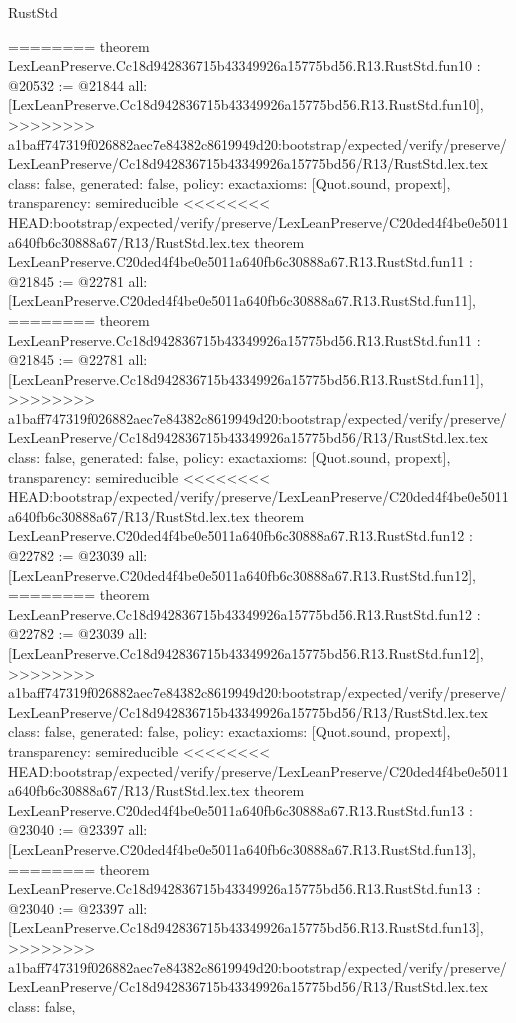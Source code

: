 \begin{lexlean}{RustStd}
\begin{coremodule}
{\begin{coremodule}
{{{{{{{{{{{{{========
theorem LexLeanPreserve.Cc18d942836715b43349926a15775bd56.R13.RustStd.fun10 : @20532 := @21844 {
  all: [LexLeanPreserve.Cc18d942836715b43349926a15775bd56.R13.RustStd.fun10],
>>>>>>>> a1baff747319f026882aec7e84382c8619949d20:bootstrap/expected/verify/preserve/LexLeanPreserve/Cc18d942836715b43349926a15775bd56/R13/RustStd.lex.tex
  class: false,
  generated: false,
  policy: exact{axioms: [Quot.sound, propext]},
  transparency: semireducible
}
<<<<<<<< HEAD:bootstrap/expected/verify/preserve/LexLeanPreserve/C20ded4f4be0e5011a640fb6c30888a67/R13/RustStd.lex.tex
theorem LexLeanPreserve.C20ded4f4be0e5011a640fb6c30888a67.R13.RustStd.fun11 : @21845 := @22781 {
  all: [LexLeanPreserve.C20ded4f4be0e5011a640fb6c30888a67.R13.RustStd.fun11],
========
theorem LexLeanPreserve.Cc18d942836715b43349926a15775bd56.R13.RustStd.fun11 : @21845 := @22781 {
  all: [LexLeanPreserve.Cc18d942836715b43349926a15775bd56.R13.RustStd.fun11],
>>>>>>>> a1baff747319f026882aec7e84382c8619949d20:bootstrap/expected/verify/preserve/LexLeanPreserve/Cc18d942836715b43349926a15775bd56/R13/RustStd.lex.tex
  class: false,
  generated: false,
  policy: exact{axioms: [Quot.sound, propext]},
  transparency: semireducible
}
<<<<<<<< HEAD:bootstrap/expected/verify/preserve/LexLeanPreserve/C20ded4f4be0e5011a640fb6c30888a67/R13/RustStd.lex.tex
theorem LexLeanPreserve.C20ded4f4be0e5011a640fb6c30888a67.R13.RustStd.fun12 : @22782 := @23039 {
  all: [LexLeanPreserve.C20ded4f4be0e5011a640fb6c30888a67.R13.RustStd.fun12],
========
theorem LexLeanPreserve.Cc18d942836715b43349926a15775bd56.R13.RustStd.fun12 : @22782 := @23039 {
  all: [LexLeanPreserve.Cc18d942836715b43349926a15775bd56.R13.RustStd.fun12],
>>>>>>>> a1baff747319f026882aec7e84382c8619949d20:bootstrap/expected/verify/preserve/LexLeanPreserve/Cc18d942836715b43349926a15775bd56/R13/RustStd.lex.tex
  class: false,
  generated: false,
  policy: exact{axioms: [Quot.sound, propext]},
  transparency: semireducible
}
<<<<<<<< HEAD:bootstrap/expected/verify/preserve/LexLeanPreserve/C20ded4f4be0e5011a640fb6c30888a67/R13/RustStd.lex.tex
theorem LexLeanPreserve.C20ded4f4be0e5011a640fb6c30888a67.R13.RustStd.fun13 : @23040 := @23397 {
  all: [LexLeanPreserve.C20ded4f4be0e5011a640fb6c30888a67.R13.RustStd.fun13],
========
theorem LexLeanPreserve.Cc18d942836715b43349926a15775bd56.R13.RustStd.fun13 : @23040 := @23397 {
  all: [LexLeanPreserve.Cc18d942836715b43349926a15775bd56.R13.RustStd.fun13],
>>>>>>>> a1baff747319f026882aec7e84382c8619949d20:bootstrap/expected/verify/preserve/LexLeanPreserve/Cc18d942836715b43349926a15775bd56/R13/RustStd.lex.tex
  class: false,
}}}}}}}}}}}}}}}}}
\end{coremodule}}
\end{coremodule}
\end{lexlean}
